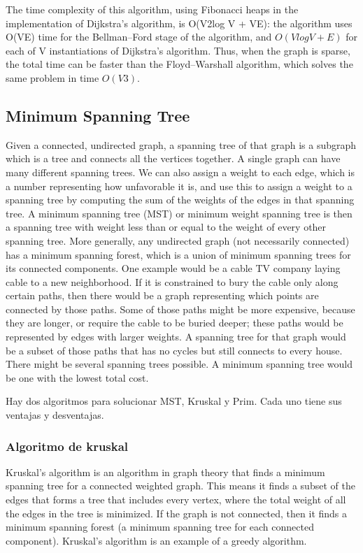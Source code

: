 \documentclass[10pt,letterpaper,twocolumn,twosided]{article}
\begin{document}
The time complexity of this algorithm, using Fibonacci heaps in the implementation of Dijkstra's algorithm, 
is O(V2log V + VE): the algorithm uses O(VE) time for the Bellman–Ford stage of the algorithm, and $O(V log V + E)$
for each of V instantiations of Dijkstra's algorithm. Thus, when the graph is sparse, the total time can be faster
than the Floyd–Warshall algorithm, which solves the same problem in time $ O(V3).$\\

\subsection{Minimum Spanning Tree}

Given a connected, undirected graph, a spanning tree of that graph is a subgraph which is a tree and connects all the vertices together. A single graph can have many different spanning trees. We can also assign a weight to each edge, which is a number representing how unfavorable it is, and use this to assign a weight to a spanning tree by computing the sum of the weights of the edges in that spanning tree. A minimum spanning tree (MST) or minimum weight spanning tree is then a spanning tree with weight less than or equal to the weight of every other spanning tree. More generally, any undirected graph (not necessarily connected) has a minimum spanning forest, which is a union of minimum spanning trees for its connected components.
One example would be a cable TV company laying cable to a new neighborhood. If it is constrained to bury the cable only along certain paths, then there would be a graph representing which points are connected by those paths. Some of those paths might be more expensive, because they are longer, or require the cable to be buried deeper; these paths would be represented by edges with larger weights. A spanning tree for that graph would be a subset of those paths that has no cycles but still connects to every house. There might be several spanning trees possible. A minimum spanning tree would be one with the lowest total cost.

Hay dos algoritmos para solucionar MST, Kruskal y Prim. Cada uno tiene sus ventajas y desventajas.

\subsubsection{Algoritmo de kruskal}

Kruskal's algorithm is an algorithm in graph theory that finds a minimum spanning tree for a connected weighted graph. This means it finds a subset of the edges that forms a tree that includes every vertex, where the total weight of all the edges in the tree is minimized. If the graph is not connected, then it finds a minimum spanning forest (a minimum spanning tree for each connected component). Kruskal's algorithm is an example of a greedy algorithm.
\end{document}
